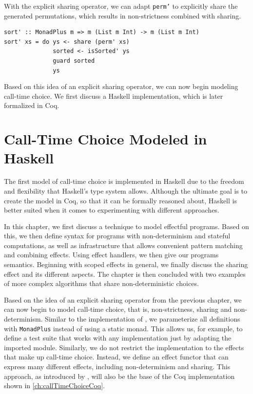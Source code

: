 \documentclass[a4paper, 11pt, fleqn, twoside, abstract=on]{scrreprt}
\newcommand{\hinl}[1]{\texttt{#1}}
\begin{document}
With the explicit sharing operator, we can adapt \hinl{perm'} to explicitly share the generated permutations, which results in non-strictness combined with sharing.

\begin{verbatim}
sort' :: MonadPlus m => m (List m Int) -> m (List m Int)
sort' xs = do ys <- share (perm' xs)
              sorted <- isSorted' ys
              guard sorted
              ys
\end{verbatim}

Based on this idea of an explicit sharing operator, we can now begin modeling call-time choice.
We first discuss a Haskell implementation, which is later formalized in Coq.

\chapter{Call-Time Choice Modeled in Haskell}
\label{ch:callTimeChoiceHaskell}
The first model of call-time choice is implemented in Haskell due to the freedom and flexibility that Haskell's type system allows.
Although the ultimate goal is to create the model in Coq, so that it can be formally reasoned about, Haskell is better suited when it comes to experimenting with different approaches.

In this chapter, we first discuss a technique to model effectful programs.
Based on this, we then define syntax for programs with non-determinism and stateful computations, as well as infrastructure that allows convenient pattern matching and combining effects.
Using effect handlers, we then give our programs semantics.
Beginning with scoped effects in general, we finally discuss the sharing effect and its different aspects.
The chapter is then concluded with two examples of more complex algorithms that share non-deterministic choices.

Based on the idea of an explicit sharing operator from the previous chapter, we can now begin to model call-time choice, that is, non-strictness, sharing and non-determinism.
Similar to the implementation of \citet{fischer2009purely}, we parameterize all definitions with \hinl{MonadPlus} instead of using a static monad.
This allows us, for example, to define a test suite that works with any implementation just by adapting the imported module.
Similarly, we do not restrict the implementation to the effects that make up call-time choice.
Instead, we define an effect functor that can express many different effects, including non-determinism and sharing.
This approach, as introduced by \citet{wu2014effect}, will also be the base of the Coq implementation shown in \autoref{ch:callTimeChoiceCoq}.
\end{document}
